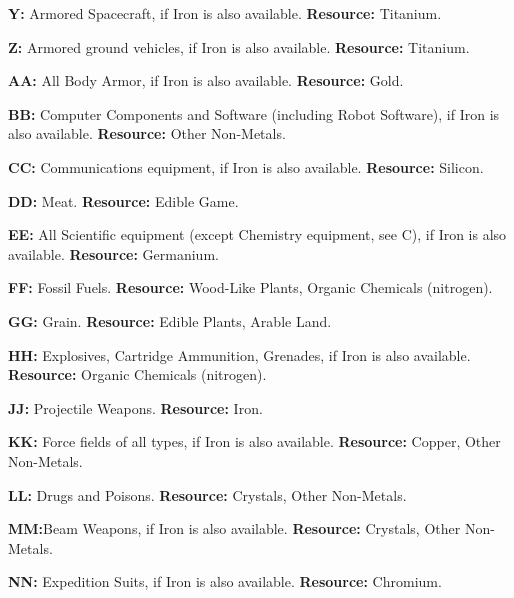 \begin{table}[htbp]
{\begin{minipage}{0.95\textwidth}
\begin{minipage}{0.95\textwidth}
\begin{multicols}{3}
          \textbf{Y:} Armored Spacecraft, if Iron is also available. 
          \textbf{Resource:} Titanium. 

          \textbf{Z:} Armored ground vehicles, if Iron is also 
          available. 
          \textbf{Resource:} Titanium. 

          \textbf{AA:} All Body Armor, if Iron is also available. 
          \textbf{Resource:} Gold. 

          \textbf{BB:} Computer Components and 
          Software (including Robot Software), 
          if Iron is also available. 
          \textbf{Resource:} Other Non-Metals. 

          \textbf{CC:} Communications equipment, if 
          Iron is also available. 
          \textbf{Resource:} Silicon. 

          \textbf{DD:} Meat. 
          \textbf{Resource:} Edible Game. 

          \textbf{EE:} All Scientific equipment (except 
          Chemistry equipment, see C), if Iron 
          is also available. 
          \textbf{Resource:} Germanium. 

          \textbf{FF:} Fossil Fuels. 
          \textbf{Resource:} Wood-Like Plants, 
          Organic Chemicals (nitrogen). 

          \textbf{GG:} Grain. 
          \textbf{Resource:} Edible Plants, Arable 
          Land. 

          \textbf{HH:} Explosives, Cartridge 
          Ammunition, Grenades, if Iron is also 
          available. 
          \textbf{Resource:} Organic Chemicals 
          (nitrogen). 

          \textbf{JJ:} Projectile Weapons. 
          \textbf{Resource:} Iron. 

          \textbf{KK:} Force fields of all types, if Iron is 
          also available. 
          \textbf{Resource:} Copper, Other Non-Metals. 

          \textbf{LL:} Drugs and Poisons. 
          \textbf{Resource:} Crystals, Other Non-Metals. 

          \textbf{MM:}Beam Weapons, if Iron is also 
          available. 
          \textbf{Resource:} Crystals, Other Non-Metals. 

          \textbf{NN:} Expedition Suits, if Iron is also 
          available. 
          \textbf{Resource:} Chromium. 
        \end{multicols}
      \end{minipage}

      \vspace{0.05\textwidth}

    \end{minipage}}
\end{table}


